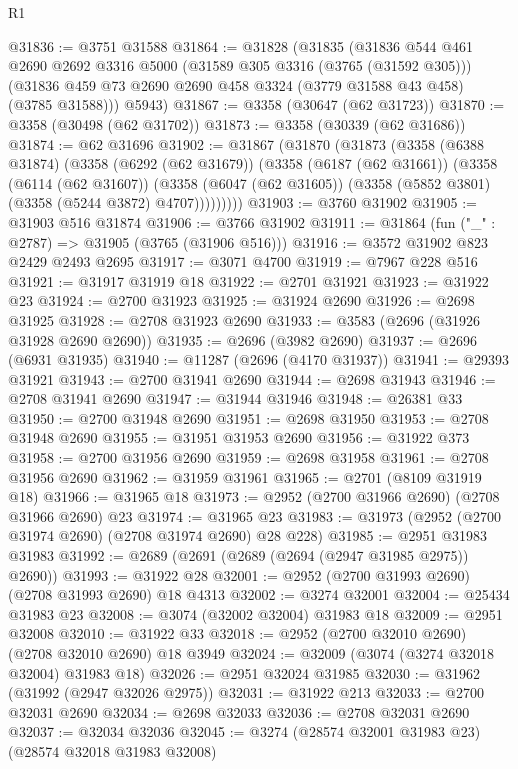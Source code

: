 \begin{lexlean}{R1}
\begin{coremodule}
@31836 := @3751 @31588
@31864 := @31828
    (@31835
      (@31836
        @544
        @461
        @2690
        @2692
        @3316
        @5000
        (@31589 @305 @3316 (@3765 (@31592 @305)))
        (@31836 @459 @73 @2690 @2690 @458 @3324 (@3779 @31588 @43 @458) (@3785 @31588)))
      @5943)
@31867 := @3358 (@30647 (@62 @31723))
@31870 := @3358 (@30498 (@62 @31702))
@31873 := @3358 (@30339 (@62 @31686))
@31874 := @62 @31696
@31902 := @31867
    (@31870
      (@31873
        (@3358
          (@6388 @31874)
          (@3358
            (@6292 (@62 @31679))
            (@3358
              (@6187 (@62 @31661))
              (@3358
                (@6114 (@62 @31607))
                (@3358 (@6047 (@62 @31605)) (@3358 (@5852 @3801) (@3358 (@5244 @3872) @4707)))))))))
@31903 := @3760 @31902
@31905 := @31903 @516 @31874
@31906 := @3766 @31902
@31911 := @31864 (fun ("_" : @2787) => @31905 (@3765 (@31906 @516)))
@31916 := @3572 @31902 @823 @2429 @2493 @2695
@31917 := @3071 @4700
@31919 := @7967 @228 @516
@31921 := @31917 @31919 @18
@31922 := @2701 @31921
@31923 := @31922 @23
@31924 := @2700 @31923
@31925 := @31924 @2690
@31926 := @2698 @31925
@31928 := @2708 @31923 @2690
@31933 := @3583 (@2696 (@31926 @31928 @2690 @2690))
@31935 := @2696 (@3982 @2690)
@31937 := @2696 (@6931 @31935)
@31940 := @11287 (@2696 (@4170 @31937))
@31941 := @29393 @31921
@31943 := @2700 @31941 @2690
@31944 := @2698 @31943
@31946 := @2708 @31941 @2690
@31947 := @31944 @31946
@31948 := @26381 @33
@31950 := @2700 @31948 @2690
@31951 := @2698 @31950
@31953 := @2708 @31948 @2690
@31955 := @31951 @31953 @2690
@31956 := @31922 @373
@31958 := @2700 @31956 @2690
@31959 := @2698 @31958
@31961 := @2708 @31956 @2690
@31962 := @31959 @31961
@31965 := @2701 (@8109 @31919 @18)
@31966 := @31965 @18
@31973 := @2952 (@2700 @31966 @2690) (@2708 @31966 @2690) @23
@31974 := @31965 @23
@31983 := @31973 (@2952 (@2700 @31974 @2690) (@2708 @31974 @2690) @28 @228)
@31985 := @2951 @31983 @31983
@31992 := @2689 (@2691 (@2689 (@2694 (@2947 @31985 @2975)) @2690))
@31993 := @31922 @28
@32001 := @2952 (@2700 @31993 @2690) (@2708 @31993 @2690) @18 @4313
@32002 := @3274 @32001
@32004 := @25434 @31983 @23
@32008 := @3074 (@32002 @32004) @31983 @18
@32009 := @2951 @32008
@32010 := @31922 @33
@32018 := @2952 (@2700 @32010 @2690) (@2708 @32010 @2690) @18 @3949
@32024 := @32009 (@3074 (@3274 @32018 @32004) @31983 @18)
@32026 := @2951 @32024 @31985
@32030 := @31962 (@31992 (@2947 @32026 @2975))
@32031 := @31922 @213
@32033 := @2700 @32031 @2690
@32034 := @2698 @32033
@32036 := @2708 @32031 @2690
@32037 := @32034 @32036
@32045 := @3274 (@28574 @32001 @31983 @23) (@28574 @32018 @31983 @32008)

\end{coremodule}
\end{lexlean}
